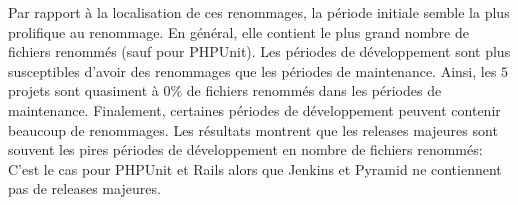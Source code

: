 Par rapport à la localisation de ces renommages, la période initiale semble la plus prolifique au renommage. En général, elle contient le plus grand nombre de fichiers renommés (sauf pour PHPUnit). Les périodes de développement sont plus susceptibles d'avoir des renommages que les périodes de maintenance. Ainsi, les $5$ projets sont quasiment à $0\%$ de fichiers renommés dans les périodes de maintenance. Finalement, certaines périodes de développement peuvent contenir beaucoup de renommages. Les résultats montrent que les releases majeures sont souvent les pires périodes de développement en nombre de fichiers renommés: C'est le cas pour PHPUnit et Rails alors que Jenkins et Pyramid ne contiennent pas de releases majeures.\\



